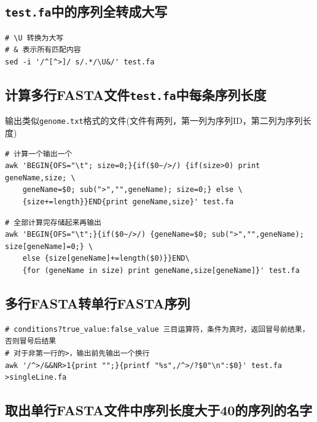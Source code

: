 \documentclass[]{article}
\numberwithin{figure}{section}
\numberwithin{table}{section}
\begin{document}
\hypertarget{fasta_uppercase}{%
\subsection{\texorpdfstring{\texttt{test.fa}中的序列全转成大写}{test.fa中的序列全转成大写}}\label{fasta_uppercase}}

\begin{verbatim}
# \U 转换为大写
# & 表示所有匹配内容
sed -i '/^[^>]/ s/.*/\U&/' test.fa
\end{verbatim}

\hypertarget{fasta_len}{%
\subsection{\texorpdfstring{计算多行FASTA文件\texttt{test.fa}中每条序列长度}{计算多行FASTA文件test.fa中每条序列长度}}\label{fasta_len}}

输出类似\texttt{genome.txt}格式的文件(文件有两列，第一列为序列ID，第二列为序列长度)

\begin{verbatim}
# 计算一个输出一个
awk 'BEGIN{OFS="\t"; size=0;}{if($0~/>/) {if(size>0) print geneName,size; \
	geneName=$0; sub(">","",geneName); size=0;} else \
	{size+=length}}END{print geneName,size}' test.fa
\end{verbatim}

\begin{verbatim}
# 全部计算完存储起来再输出
awk 'BEGIN{OFS="\t";}{if($0~/>/) {geneName=$0; sub(">","",geneName); size[geneName]=0;} \
	else {size[geneName]+=length($0)}}END\
	{for (geneName in size) print geneName,size[geneName]}' test.fa
\end{verbatim}

\hypertarget{fasta_format}{%
\subsection{多行FASTA转单行FASTA序列}\label{fasta_format}}

\begin{verbatim}
# conditions?true_value:false_value 三目运算符，条件为真时，返回冒号前结果，否则冒号后结果
# 对于非第一行的>，输出前先输出一个换行
awk '/^>/&&NR>1{print "";}{printf "%s",/^>/?$0"\n":$0}' test.fa >singleLine.fa
\end{verbatim}

\hypertarget{fasta_name}{%
\subsection{取出单行FASTA文件中序列长度大于40的序列的名字}\label{fasta_name}}
\end{document}
